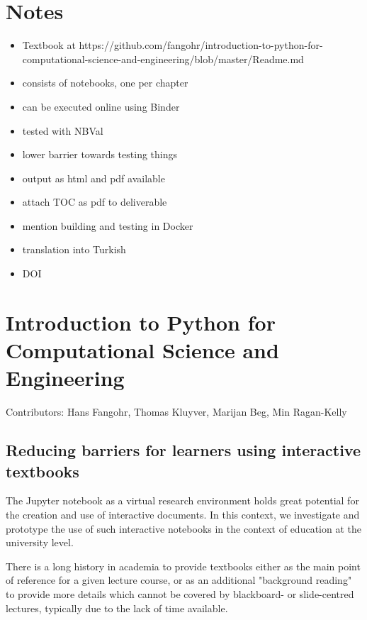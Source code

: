 \documentclass{deliverablereport}
\author{Marcin Kostur et al.}
\begin{document}
\maketitle
\githubissuedescription
\newpage
\tableofcontents
\newpage

\section{Notes}

\begin{itemize}
\item Textbook at https://github.com/fangohr/introduction-to-python-for-computational-science-and-engineering/blob/master/Readme.md
  \item consists of notebooks, one per chapter
\item can be executed online using Binder
\item tested with NBVal
\item lower barrier towards testing things
\item output as html and pdf available

\item attach TOC as pdf to deliverable

\item mention building and testing in Docker
\item translation into Turkish
\item DOI
\end{itemize}

\section{Introduction to Python for Computational Science and Engineering}

Contributors: Hans Fangohr, Thomas Kluyver, Marijan Beg, Min Ragan-Kelly

\subsection{Reducing barriers for learners using interactive textbooks}

The Jupyter notebook as a virtual research environment holds great
potential for the creation and use of interactive documents. In this
context, we investigate and prototype the use of such interactive
notebooks in the context of education at the university level.

There is a long history in academia to provide textbooks either as
the main point of reference for a given lecture course, or as an
additional "background reading" to provide more details which cannot
be covered by blackboard- or slide-centred lectures, typically due to
the lack of time available.
\end{document}
